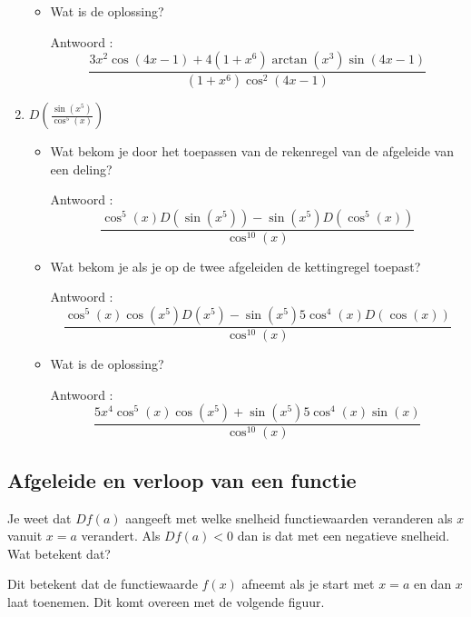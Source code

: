 \begin{enumerate}
\begin{itemize}
		\item Wat is de oplossing?
		
		Antwoord : \[\frac {3x^2\cos (4x-1) +4(1+x^6)\arctan \left( x^3 \right) \sin (4x-1)}{(1+x^6)\cos ^2(4x-1)}\]
		
	\end{itemize}
	
	\item $D \left(  \frac{\sin \left( x^5  \right)}{\cos ^5 (x)}  \right)$
	
	\begin{itemize}
		
		\item Wat bekom je door het toepassen van de rekenregel van de afgeleide van een deling?
		
		Antwoord : \[\frac {\cos ^5(x)D\left( \sin \left(  x^5  \right)  \right)-\sin \left(  x^5 \right)D\left( \cos^5(x)  \right)}{\cos ^{10}(x)}\]
		
		\item Wat bekom je als je op de twee afgeleiden de kettingregel toepast?
		
		Antwoord : \[\frac {\cos ^5(x) \cos \left(  x^5  \right) D\left( x^5 \right)-\sin \left(  x^5 \right)5 \cos^4(x) D(\cos (x))}{\cos ^{10}(x)}\]
		
		\item Wat is de oplossing?
		
		Antwoord : \[\frac {5x^4\cos ^5(x) \cos \left(  x^5  \right)+\sin \left(  x^5 \right)5 \cos^4(x) \sin (x)}{\cos ^{10}(x)}\]
		
	\end{itemize}
	
	
\end{enumerate}


\subsection{Afgeleide en verloop van een functie}

Je weet dat $Df(a)$ aangeeft met welke snelheid functiewaarden veranderen als $x$ vanuit $x=a$ verandert.
Als $Df(a)<0$ dan is dat met een negatieve snelheid. Wat betekent dat?\vspace{5mm}

Dit betekent dat de functiewaarde $f(x)$ afneemt als je start met $x=a$ en dan $x$ laat toenemen.
Dit komt overeen met de volgende figuur.


